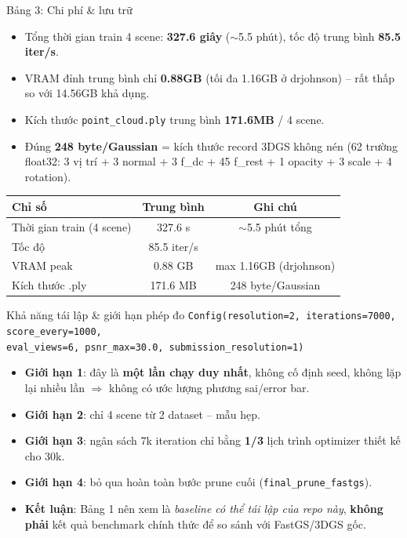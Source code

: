 \begin{frame}{Bảng 3: Chi phí \& lưu trữ}
\begin{itemize}
    \item Tổng thời gian train 4 scene: \textbf{327.6 giây} ($\sim$5.5 phút), tốc độ trung bình \textbf{85.5 iter/s}.
    \item VRAM đỉnh trung bình chỉ \textbf{0.88GB} (tối đa 1.16GB ở drjohnson) -- rất thấp so với 14.56GB khả dụng.
    \item Kích thước \texttt{point\_cloud.ply} trung bình \textbf{171.6MB} / 4 scene.
    \item Đúng \textbf{248 byte/Gaussian} = kích thước record 3DGS không nén (62 trường float32: 3 vị trí + 3 normal + 3 f\_dc + 45 f\_rest + 1 opacity + 3 scale + 4 rotation).
\end{itemize}
\vspace{0.3em}
\footnotesize
\centering
\begin{tabular}{lcc}
\toprule
\textbf{Chỉ số} & \textbf{Trung bình} & \textbf{Ghi chú} \\
\midrule
Thời gian train (4 scene) & 327.6 s & $\sim$5.5 phút tổng \\
Tốc độ & 85.5 iter/s & \\
VRAM peak & 0.88 GB & max 1.16GB (drjohnson) \\
Kích thước .ply & 171.6 MB & 248 byte/Gaussian \\
\bottomrule
\end{tabular}
\end{frame}

\begin{frame}{Khả năng tái lập \& giới hạn phép đo}
\footnotesize
\texttt{Config(resolution=2, iterations=7000, score\_every=1000,\\
\hspace{2em}eval\_views=6, psnr\_max=30.0, submission\_resolution=1)}
\normalsize
\vspace{0.5em}
\begin{itemize}
    \item \textbf{Giới hạn 1}: đây là \textbf{một lần chạy duy nhất}, không cố định seed, không lặp lại nhiều lần $\Rightarrow$ không có ước lượng phương sai/error bar.
    \item \textbf{Giới hạn 2}: chỉ 4 scene từ 2 dataset -- mẫu hẹp.
    \item \textbf{Giới hạn 3}: ngân sách 7k iteration chỉ bằng \textbf{1/3} lịch trình optimizer thiết kế cho 30k.
    \item \textbf{Giới hạn 4}: bỏ qua hoàn toàn bước prune cuối (\texttt{final\_prune\_fastgs}).
    \item[$\Rightarrow$] \textbf{Kết luận}: Bảng 1 nên xem là \emph{baseline có thể tái lập của repo này}, \textbf{không phải} kết quả benchmark chính thức để so sánh với FastGS/3DGS gốc.
\end{itemize}
\end{frame}
